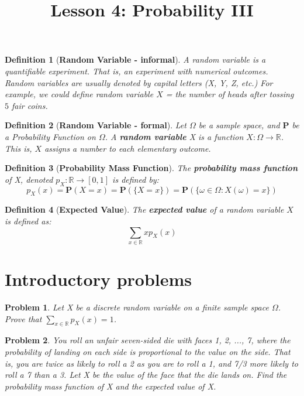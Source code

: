 \documentclass[a4paper,12pt]{article}
\title{Lesson 4: Probability III}
\theoremstyle{perfect}
\newtheorem{dfn}{Definition}
\newtheorem{prb}{Problem}
\newcommand{\R}{\mathbb{R}}
\newcommand{\PP}{\mathbf{P}}
\begin{document}
 
\maketitle


\begin{dfn}[\textbf{Random Variable - informal}]
A random variable is a quantifiable experiment. That
is, an experiment with numerical outcomes. 
Random variables are usually denoted by capital letters (X, Y, Z, etc.)
For example, we could define random variable $X$ = the number of heads
after tossing $5$ fair coins.
\end{dfn}


\begin{dfn}[\textbf{Random Variable - formal}]
Let $\Omega$ be a sample space, and $\PP$ be a Probability Function on $\Omega$. A \textbf{random variable} X is a function $X : \Omega \to \R$. This is, $X$ assigns a number to each elementary outcome.
\end{dfn}


\begin{dfn}[\textbf{Probability Mass Function}]
The \textbf{probability mass function} of X, denoted $p_X : \R \to [0, 1]$ is defined by:
$$p_X(x) = \PP(X = x) = \PP(\{X = x\}) = \PP(\{\omega \in \Omega: X(\omega) = x\})$$
\end{dfn}

\begin{dfn}[\textbf{Expected Value}]
The \textbf{expected value} of a random variable $X$ is defined as:
$$\sum_{x \in \R} x p_X(x)$$
\end{dfn}


\section{Introductory problems}


\begin{prb}
Let X be a discrete random variable on a finite sample space $\Omega$. Prove that $\sum_{x \in \R} p_X(x) = 1$.
\end{prb}

\begin{prb}
You roll an unfair seven-sided die with faces 1, 2, ..., 7, where the probability of landing on each side is proportional to the value on the side. That is, you are twice as likely to roll a 2 as you are to roll a 1, and 7/3 more likely to roll a 7 than a 3. Let X be the value of the face that the die lands on. Find the probability mass function of X and the expected value of X.
\end{prb}
\end{document}

